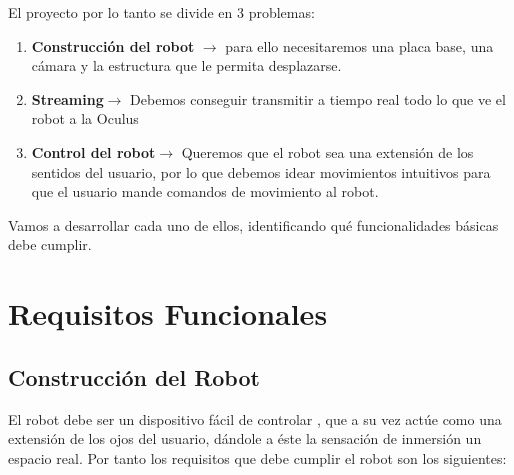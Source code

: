 \documentclass[twoside, 11pt]{epstfg}
\begin{document}
El proyecto por lo tanto se divide en 3 problemas:
\begin{enumerate}
	\item \textbf{Construcción del robot} $\rightarrow$ para ello necesitaremos una placa base, una cámara y la estructura que le permita desplazarse.
	\item \textbf{Streaming}$\rightarrow$ Debemos conseguir transmitir a tiempo real todo lo que ve el robot a la Oculus
	\item \textbf{Control del robot}$\rightarrow$ Queremos que el robot sea una extensión de los sentidos del usuario, por lo que debemos idear movimientos intuitivos para que el usuario mande comandos de movimiento al robot.
\end{enumerate}

Vamos a desarrollar cada uno de ellos, identificando qué funcionalidades básicas debe cumplir.

\section{Requisitos Funcionales}

\subsection{Construcción del Robot}


El robot debe ser un dispositivo fácil de controlar , que a su vez actúe como una extensión de los ojos del usuario, dándole a éste la sensación de inmersión un espacio real.
Por tanto los requisitos que debe cumplir el robot son los siguientes:
\end{document}
